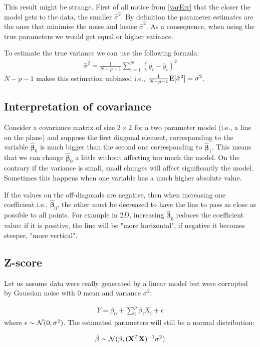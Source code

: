 \documentclass[12pt, letterpaper]{article}
\theoremstyle{definition}
\newcommand{\E}{{\rm I\kern-.3em E}}
\newcommand{\X}{\mathrm{\mathbf{X}}}
\newcommand{\hs}{\hat{\sigma}^2}
\newcommand{\hb}{\mathrm{\hat{\mathbf{\beta}}}}
\begin{document}
This result might be strange. First of all notice from \ref{varErr} that the closer the model gets to the data, the smaller $\hs$. By definition the parameter estimates are the ones that minimise the noise and hence $\hs$. As a consequence, when using the true parameters we would get equal or higher variance.

To estimate the true variance we can use the following formula:
\begin{align}
\hat{\sigma}^2 = \frac{1}{N-p-1}\sum_{i=1}^{N}(y_i-\hat{y}_i)^2
\end{align}
$N-p-1$ makes this estimation unbiased i.e., $\frac{1}{N-p-1}\E[\hat{\sigma}^2] =\sigma^2$.

\subsection{Interpretation of covariance}
Consider a covariance matrix of size $2\times 2$ for a two parameter model (i.e., a line on the plane) and suppose the first diagonal element, corresponding to the variable $\hb_0$ is much bigger than the second one corresponding to $\hb_1$. This means that we can change $\hb_0$ a little without affecting too much the model. On the contrary if the variance is small, small changes will affect significantly the model. Sometimes this happens when one variable has a much higher absolute value.

If the values on the off-diagonals are negative, then when increasing one coefficient i.e., $\hb_0$, the other must be decreased to have the line to pass as close as possible to all points. For example in $2D$, increasing $\hb_0$ reduces the coefficient value: if it is positive, the line will be "more horizontal", if negative it becomes steeper, "more vertical".
\subsection{Z-score}
Let us assume data were really generated by a linear model but were corrupted by Gaussian noise with $0$ mean and variance $\sigma^2$:

\begin{align}
Y = \beta_0 +\sum_i^p \beta_i X_i + \epsilon
\end{align} 
where $\epsilon \sim \CMcal{N}(0,\sigma^2)$.
The estimated parameters will still be a normal distribution:

\begin{align}
\label{parameterVar}
\hat{\beta} \sim \CMcal{N}(\beta,  (\X^T\X)^{-1} \sigma^2)
\end{align}
\end{document}
